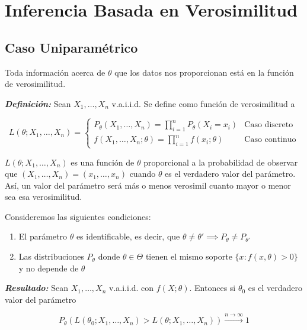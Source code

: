 \section{Inferencia Basada en Verosimilitud}


\subsection{Caso Uniparamétrico}

Toda información acerca de $\theta$ que los datos nos proporcionan está en la función de verosimilitud.

\textbf{\textit{Definición: }} Sean $X_1, \dots, X_n$ v.a.i.i.d. Se define como función de verosimilitud a

\[
    L(\theta; X_1,\dots,X_n) =
    \begin{cases}
        P_\theta(X_1,\dots,X_n)=\prod_{i=1}^{n}P_\theta(X_i=x_i) & \text{Caso discreto} \\
        f(X_1,\dots,X_n; \theta)=\prod_{i=1}^{n}f(x_i; \theta)   & \text{Caso continuo}
    \end{cases}
\]

$L(\theta; X_1,\dots,X_n)$ es una función de $\theta$ proporcional a la probabilidad de observar que $(X_1,\dots,X_n)=(x_1,\dots,x_n)$ cuando $\theta$ es el verdadero valor del parámetro. Así, un valor del parámetro será más o menos verosimil cuanto mayor o menor sea esa verosimilitud.

Consideremos las siguientes condiciones:

\begin{enumerate}
    \item El parámetro $\theta$ es identificable, es decir, que $\theta \neq \theta' \implies P_\theta \neq P_{\theta'}$
    \item Las distribuciones $P_\theta$ donde $\theta \in \Theta$ tienen el mismo soporte $\{x:f(x,\theta) > 0\}$ y no depende de $\theta$
\end{enumerate}

\textbf{\textit{Resultado: }} Sean $X_1,\dots,X_n$ v.a.i.i.d. con $f(X;\theta)$. Entonces si $\theta_0$ es el verdadero valor del parámetro

\[
    P_\theta(L(\theta_0;X_1,\dots,X_n)>L(\theta;X_1,\dots,X_n))\xrightarrow{n\to\infty}1
\]

